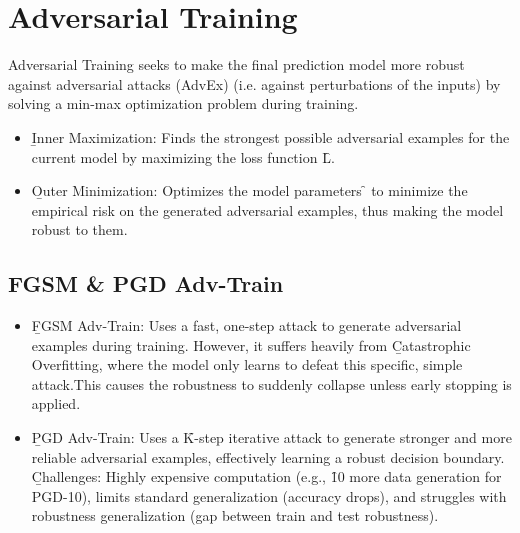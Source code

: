 \section{Adversarial Training}

Adversarial Training seeks to make the final prediction model more robust against adversarial attacks (AdvEx) (i.e. against perturbations of the inputs) by solving a min-max optimization problem during training.
\begin{itemize}
\item \b{Inner Maximization}: Finds the strongest possible adversarial examples for the current model by maximizing the loss function \f{L}.
\item \b{Outer Minimization}: Optimizes the model parameters \f{\theta} to minimize the empirical risk on the generated adversarial examples, thus making the model robust to them.
\end{itemize}



\subsection{FGSM \& PGD Adv-Train}
\begin{itemize}
\item \b{FGSM Adv-Train}: Uses a fast, one-step attack to generate adversarial examples during training. However, it suffers heavily from \b{Catastrophic Overfitting}, where the model only learns to defeat this specific, simple attack.This causes the robustness to suddenly collapse unless early stopping is applied.
\item \b{PGD Adv-Train}: Uses a \f{K}-step iterative attack to generate stronger and more reliable adversarial examples, effectively learning a robust decision boundary.\\[.5em]
\b{Challenges}: Highly expensive computation (e.g., \f{10\times} more data generation for PGD-10), limits standard generalization (accuracy drops), and struggles with robustness generalization (gap between train and test robustness).
\end{itemize}




